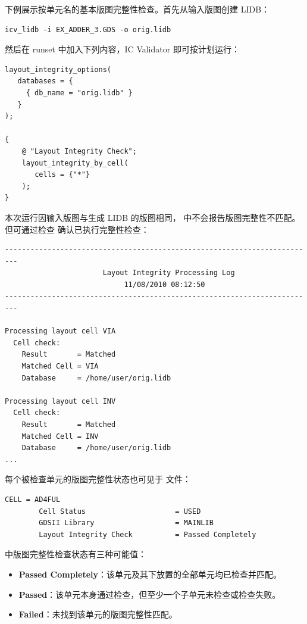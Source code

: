 下例展示按单元名的基本版图完整性检查。首先从输入版图创建 LIDB：

\begin{lstlisting}
icv_lidb -i EX_ADDER_3.GDS -o orig.lidb
\end{lstlisting}

然后在 runset 中加入下列内容，IC Validator 即可按计划运行：

\begin{lstlisting}[style=pxl]
layout_integrity_options(
   databases = {
     { db_name = "orig.lidb" }
   }
);

{
    @ "Layout Integrity Check";
    layout_integrity_by_cell(
       cells = {"*"}
    );
}
\end{lstlisting}

本次运行因输入版图与生成 LIDB 的版图相同， 中不会报告版图完整性不匹配。但可通过检查  确认已执行完整性检查：

\begin{lstlisting}
-------------------------------------------------------------------------
                       Layout Integrity Processing Log
                            11/08/2010 08:12:50
-------------------------------------------------------------------------

Processing layout cell VIA
  Cell check:
    Result       = Matched
    Matched Cell = VIA
    Database     = /home/user/orig.lidb

Processing layout cell INV
  Cell check:
    Result       = Matched
    Matched Cell = INV
    Database     = /home/user/orig.lidb
...
\end{lstlisting}

每个被检查单元的版图完整性状态也可见于  文件：

\begin{lstlisting}
CELL = AD4FUL
        Cell Status                     = USED
        GDSII Library                   = MAINLIB
        Layout Integrity Check          = Passed Completely
\end{lstlisting}

 中版图完整性检查状态有三种可能值：
\begin{itemize}
  \item \textbf{Passed Completely}：该单元及其下放置的全部单元均已检查并匹配。
  \item \textbf{Passed}：该单元本身通过检查，但至少一个子单元未检查或检查失败。
  \item \textbf{Failed}：未找到该单元的版图完整性匹配。
\end{itemize}

